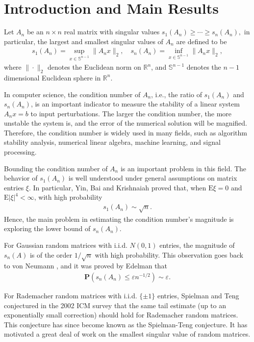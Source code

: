 \documentclass{article}
\numberwithin{equation}{section}
\theoremstyle{plain}
\begin{document}
\section{Introduction and Main Results}\label{sec1}
Let $A_n$ be an $n\times n$ real matrix with singular values $s_1(A_n)\ge\cdots\ge s_n(A_n),$ in particular, the largest and smallest singular values of $A_n$ are defined to be 
\begin{align*}
s_1(A_n) = \sup_{x\in \mathbb{S}^{n-1}}\|A_n x\|_2, \quad s_n(A_n) = \inf_{x\in \mathbb{S}^{n-1}}\|A_n x\|_2,
\end{align*}
where $\|\cdot\|_2$ denotes the Euclidean norm on $\mathbb{R}^n$, and $\mathbb{S}^{n-1}$ denotes the $n-1$ dimensional Euclidean sphere in $\mathbb{R}^n$.
\par
In computer science, the condition number of $A_n$, i.e., the ratio of $s_1(A_n)$ and $s_n(A_n)$, is an important indicator to measure the stability of a linear system $A_n x=b$ to input perturbations. The larger the condition number, the more unstable the system is, and the error of the numerical solution will be magnified. Therefore, the condition number is widely used in many fields, such as algorithm stability analysis, numerical linear algebra, machine learning, and signal processing.
\par
Bounding the condition number of $A_n$ is an important problem in this field. The behavior of $s_1(A_n)$ is well understood under general assumptions on matrix entries $\xi$. In particular, Yin, Bai and Krishnaiah \cite{MR950344} proved that, when $\mathrm{E} \xi=0$ and $\mathrm{E}|\xi|^4<\infty$, with high probability
\begin{align*}
s_1(A_n) \sim \sqrt{n}.
\end{align*}
Hence, the main problem in estimating the condition number's magnitude is exploring the lower bound of $s_n(A_n)$.
\par
For Gaussian random matrices with i.i.d. $N(0,1)$ entries, the magnitude of $s_n(A)$ is of the order $1 / \sqrt{n}$ with high probability. This observation goes back to von Neumann \cite{MR157875}, and it was proved by Edelman \cite{doi:10.1137/0609045} that
\begin{align*}
\textbf{P}\left(s_n\left(A_n\right) \leq \varepsilon n^{-1 / 2}\right) \sim \varepsilon.
\end{align*}

For Rademacher random matrices with i.i.d. $\{\pm1\}$ entries, Spielman and Teng \cite{MR1989210} conjectured in the 2002 ICM survey that the same tail estimate (up to an exponentially small correction) should hold for Rademacher random matrices. This conjecture has since become known as the Spielman-Teng conjecture. It has motivated a great deal of work on the smallest singular value of random matrices.
\end{document}

